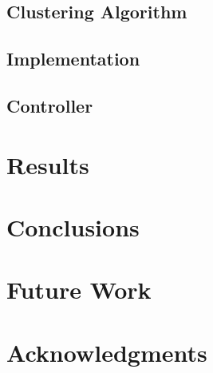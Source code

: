 \documentclass{sig-alternate}
\begin{document}
\subsection{Clustering Algorithm}

\subsection{Implementation}

\subsection{Controller}

\section{Results}

\section{Conclusions}

\section{Future Work}

\section{Acknowledgments}

\cite{salas:calculus}

%

\end{document}
